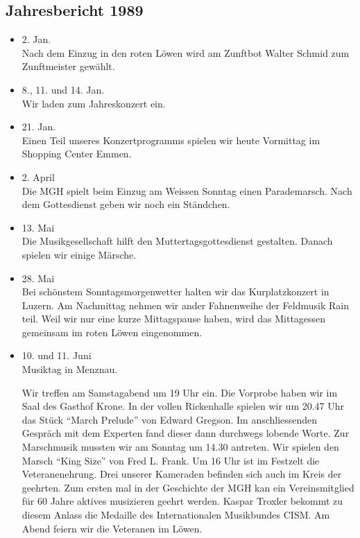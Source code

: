 \subsection{Jahresbericht 1989}

\begin{history}


    \begin{itemize}

        \item[]2. Jan.\\
        Nach dem Einzug in den roten Löwen wird am Zunftbot Walter Schmid zum
        Zunftmeister gewählt.

        \item[]8., 11. und 14. Jan.\\
        Wir laden zum Jahreskonzert ein.

        \item[]21. Jan.\\
        Einen Teil unseres Konzertprogramms spielen wir heute Vormittag im
        Shopping Center Emmen.

        \item[]2. April\\
        Die MGH spielt beim Einzug am Weissen Sonntag einen Parademarsch. Nach
        dem Gottesdienst geben wir noch ein Ständchen.

        \item[]13. Mai\\
        Die Musikgesellschaft hilft den Muttertagsgottesdienst gestalten. Danach
        spielen wir einige Märsche.

        \item[]28. Mai\\
        Bei schönstem Sonntagsmorgenwetter halten wir das Kurplatzkonzert in
        Luzern. Am Nachmittag nehmen wir ander Fahnenweihe der Feldmusik Rain
        teil. Weil wir nur eine kurze Mittagspause haben, wird das Mittagessen
        gemeinsam im roten Löwen eingenommen.

        \item[]10. und 11. Juni\\
        Musiktag in Menznau.

        Wir treffen am Samstagabend um 19 Uhr ein. Die
        Vorprobe haben wir im Saal des Gasthof Krone. In der vollen Rickenhalle
        spielen wir um 20.47 Uhr das Stück \enquote{March Prelude} von Edward
        Gregson. Im anschliessenden Gespräch mit dem Experten fand dieser dann
        durchwegs lobende Worte. Zur Marschmusik mussten wir am Sonntag um 14.30
        antreten. Wir spielen den Marsch \enquote{King Size} von Fred L. Frank.
        Um 16 Uhr ist im Festzelt die Veteranenehrung. Drei unserer Kameraden
        befinden sich auch im Kreis der geehrten. Zum ersten mal in der
        Geschichte der MGH kan ein Vereinsmitglied für 60 Jahre aktives
        musizieren geehrt werden. Kaspar Troxler bekommt zu diesem Anlass die
        Medaille des Internationalen Musikbundes CISM. Am Abend feiern wir die
        Veteranen im Löwen.


\end{itemize}
\end{history}
